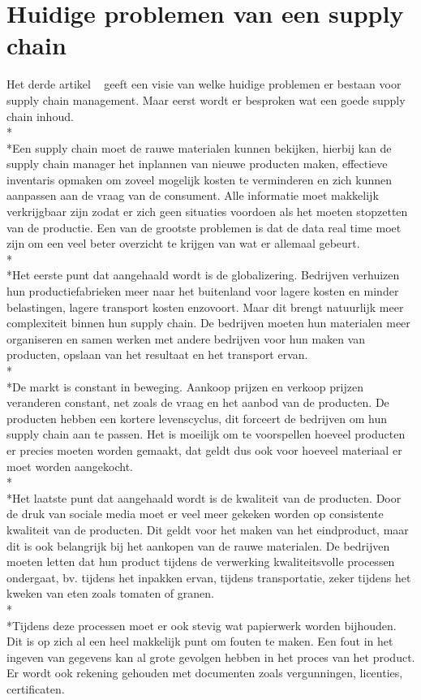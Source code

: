 \section{Huidige problemen van een supply chain}
Het derde artikel ~\autocite{prob1} geeft een visie van welke huidige problemen er bestaan voor supply chain management. Maar eerst wordt er besproken wat een goede supply chain inhoud.\\*\\*Een supply chain moet de rauwe materialen kunnen bekijken, hierbij kan de supply chain manager het inplannen van nieuwe producten maken, effectieve inventaris opmaken om zoveel mogelijk kosten te verminderen en zich kunnen aanpassen aan de vraag van de consument. Alle informatie moet makkelijk verkrijgbaar zijn zodat er zich geen situaties voordoen als het moeten stopzetten van de productie. Een van de grootste problemen is dat de data real time moet zijn om een veel beter overzicht te krijgen van wat er allemaal gebeurt.\\*\\*Het eerste punt dat aangehaald wordt is de globalizering. Bedrijven verhuizen hun productiefabrieken meer naar het buitenland voor lagere kosten en minder belastingen, lagere transport kosten enzovoort. Maar dit brengt natuurlijk meer complexiteit binnen hun supply chain. De bedrijven moeten hun materialen meer organiseren en samen werken met andere bedrijven voor hun maken van producten, opslaan van het resultaat en het transport ervan.\\*\\*De markt is constant in beweging. Aankoop prijzen en verkoop prijzen veranderen constant, net zoals de vraag en het aanbod van de producten. De producten hebben een kortere levenscyclus, dit forceert de bedrijven om hun supply chain aan te passen. Het is moeilijk om te voorspellen hoeveel producten er precies moeten worden gemaakt, dat geldt dus ook voor hoeveel materiaal er moet worden aangekocht.\\*\\*Het laatste punt dat aangehaald wordt is de kwaliteit van de producten. Door de druk van sociale media moet er veel meer gekeken worden op consistente kwaliteit van de producten. Dit geldt voor het maken van het eindproduct, maar dit is ook belangrijk bij het aankopen van de rauwe materialen. De bedrijven moeten letten dat hun product tijdens de verwerking kwaliteitsvolle processen ondergaat, bv. tijdens het inpakken ervan, tijdens transportatie, zeker tijdens het kweken van eten zoals tomaten of granen.\\*\\*Tijdens deze processen moet er ook stevig wat papierwerk worden bijhouden. Dit is op zich al een heel makkelijk punt om fouten te maken. Een fout in het ingeven van gegevens kan al grote gevolgen hebben in het proces van het product. Er wordt ook rekening gehouden met documenten zoals vergunningen, licenties, certificaten.


